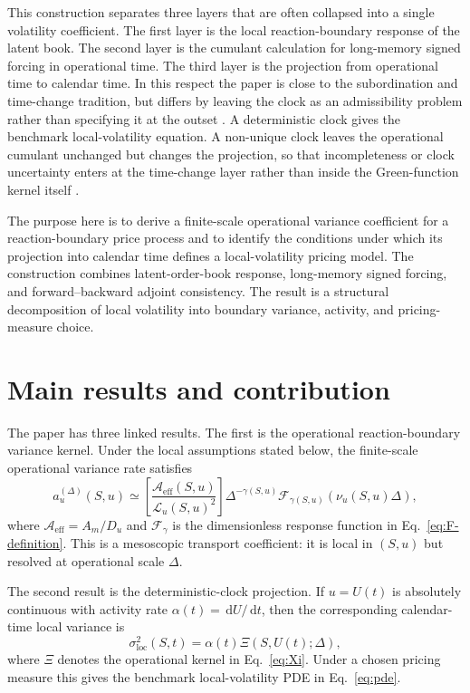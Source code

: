 \documentclass[11pt]{amsart}
\newcommand{\dd}{\,\mathrm{d}}
\newcommand{\cL}{\mathcal{L}}
\newcommand{\sigloc}{\sigma_{\mathrm{loc}}}
\newcommand{\Aeff}{\mathcal{A}_{\mathrm{eff}}}
\newcommand{\Fcal}{\mathcal{F}}
\newcommand{\Xiop}{\Xi}
\theoremstyle{definition}
\theoremstyle{plain}
\theoremstyle{remark}
\begin{document}
This construction separates three layers that are often collapsed into a single volatility coefficient. The first layer is the local reaction-boundary response of the latent book. The second layer is the cumulant calculation for long-memory signed forcing in operational time. The third layer is the projection from operational time to calendar time. In this respect the paper is close to the subordination and time-change tradition, but differs by leaving the clock as an admissibility problem rather than specifying it at the outset \cite{Bochner1949,Clark1973,CarrWu2004}. A deterministic clock gives the benchmark local-volatility equation. A non-unique clock leaves the operational cumulant unchanged but changes the projection, so that incompleteness or clock uncertainty enters at the time-change layer rather than inside the Green-function kernel itself \cite{AngstmannGebbie2026NonUniqueTime}.

The purpose here is to derive a finite-scale operational variance coefficient for a reaction-boundary price process and to identify the conditions under which its projection into calendar time defines a local-volatility pricing model. The construction combines latent-order-book response, long-memory signed forcing, and forward--backward adjoint consistency. The result is a structural decomposition of local volatility into boundary variance, activity, and pricing-measure choice.

\section{Main results and contribution}

The paper has three linked results. The first is the operational reaction-boundary variance kernel. Under the local assumptions stated below, the finite-scale operational variance rate satisfies
\begin{equation}
 a_u^{(\Delta)}(S,u)
 \simeq
 \left[\frac{\Aeff(S,u)}{\cL_u(S,u)^2}\right]
 \Delta^{-\gamma(S,u)}
 \Fcal_{\gamma(S,u)}(\nu_u(S,u)\Delta),
 \label{eq:main-operational-result}
\end{equation}
where $\Aeff=A_m/D_u$ and $\Fcal_\gamma$ is the dimensionless response function in Eq.~\eqref{eq:F-definition}. This is a mesoscopic transport coefficient: it is local in $(S,u)$ but resolved at operational scale $\Delta$.

The second result is the deterministic-clock projection. If $u=U(t)$ is absolutely continuous with activity rate $\alpha(t)=\dd U/\dd t$, then the corresponding calendar-time local variance is
\begin{equation}
 \sigloc^2(S,t)=\alpha(t)\Xiop(S,U(t);\Delta),
 \label{eq:main-clock-result}
\end{equation}
where $\Xiop$ denotes the operational kernel in Eq.~\eqref{eq:Xi}. Under a chosen pricing measure this gives the benchmark local-volatility PDE in Eq.~\eqref{eq:pde}.
\end{document}
